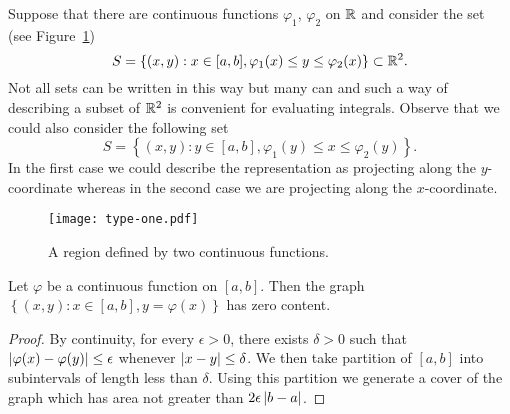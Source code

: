 Suppose that there are continuous functions \(\varphi_1\), \(\varphi_2\) on \(\mathbb{R}\) and consider the set (see Figure~\ref{fig:type-one})
\[
    S = \left\{(x,y): x \in [a,b], \varphi_1(x) \leq y \leq \varphi_2(x)\right\} \subset \mathbb{R}^2.
\]
Not all sets can be written in this way but many can and such a way of describing a subset of \(\mathbb{R}^2\) is convenient for evaluating integrals.
Observe that we could also consider the following set
\[
    S = \left\{(x,y): y \in [a,b], \varphi_1(y) \leq x \leq \varphi_2(y)\right\}.
\]
In the first case we could describe the representation as projecting along the \(y\)-coordinate whereas in the second case we are projecting along the \(x\)-coordinate.
%
%
\begin{figure}
    \centering
    \texttt{[image: type-one.pdf]}
    \caption{A region defined by two continuous functions.}%
    \label{fig:type-one}
\end{figure}
%
\begin{theorem*}
    Let \(\varphi\) be a continuous function on \([a,b]\).
    Then the graph
    \(\left\{(x,y): x\in [a,b], y=\varphi(x)\right\}\)
    has zero content.
\end{theorem*}
%
\begin{proof}
    By continuity, for every \(\epsilon>0\), there exists \(\delta>0\) such that \(\left|\varphi(x) - \varphi(y)\right|\leq \epsilon\) whenever \(\left|x-y\right|\leq \delta\).
    We then take partition of \([a,b]\) into subintervals of length less than \(\delta\).
    Using this partition we generate a cover of the graph which has area not greater than \(2\epsilon \left|b-a\right|\).
\end{proof}

